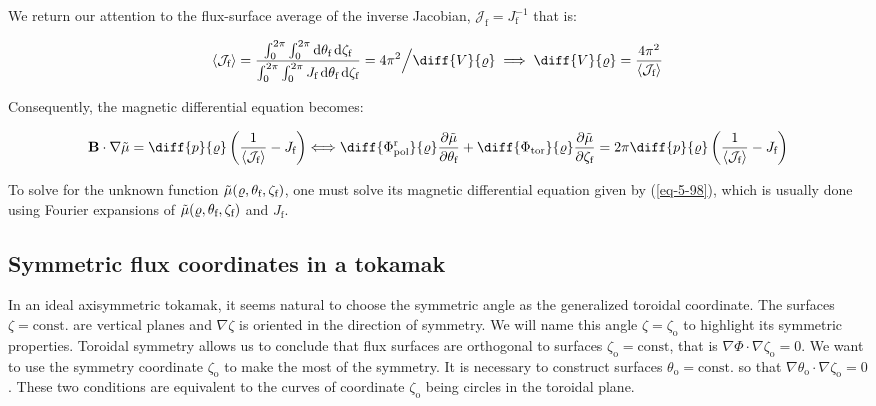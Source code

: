 We return our attention to the flux-surface average of the inverse Jacobian, $\mathcal{J}_\text{f}=J_\text{f}^{-1}$ that is:

\begin{equation}
    \label{eq-5-97}
    \langle\mathcal{J}_\text{f}\rangle=\frac{\int_0^{2\pi}\int_0^{2\pi}\mathrm{d}\theta_\text{f}\,\mathrm{d}\zeta_\text{f}}{\int_0^{2\pi}\int_0^{2\pi}J_\text{f}\,\mathrm{d}\theta_\text{f}\,\mathrm{d}\zeta_\text{f}}=4\pi^2\Big/\diff{V}{\varrho}\implies\diff{V}{\varrho}=\frac{4\pi^2}{\langle\mathcal{J}_\text{f}\rangle}
\end{equation}

Consequently, the magnetic differential equation becomes:

\begin{equation}
    \label{eq-5-98}
    \mathbf{B}\cdot\nabla\Tilde{\mu}=\diff{p}{\varrho}\left(\frac{1}{\langle\mathcal{J}_\text{f}\rangle}-J_\text{f}\right)\Longleftrightarrow\diff{\Phi_\text{pol}^\text{r}}{\varrho}\frac{\partial\Tilde{\mu}}{\partial\theta_\text{f}}+\diff{\Phi_\text{tor}}{\varrho}\frac{\partial\Tilde{\mu}}{\partial\zeta_\text{f}}=2\pi\diff{p}{\varrho}\left(\frac{1}{\langle\mathcal{J}_\text{f}\rangle}-J_\text{f}\right)
\end{equation}

To solve for the unknown function $\Tilde{\mu}(\varrho,\theta_\text{f},\zeta_\text{f})$, one must solve its magnetic differential equation given by (\ref{eq-5-98}), which is usually done using Fourier expansions of $\Tilde{\mu}(\varrho,\theta_\text{f},\zeta_\text{f})$ and $J_\text{f}$.

\subsection{Symmetric flux coordinates in a tokamak}

In an ideal axisymmetric tokamak, it seems natural to choose the symmetric angle as the generalized toroidal coordinate. The surfaces $\zeta=\text{const.}$ are vertical planes and $\nabla\zeta$ is oriented in the direction of symmetry. We will name this angle $\zeta=\zeta_\text{o}$ to highlight its symmetric properties. Toroidal symmetry allows us to conclude that flux surfaces are orthogonal to surfaces $\zeta_\text{o}=\text{const}$, that is $\nabla\Phi\cdot\nabla\zeta_\text{o}=0$. We want to use the symmetry coordinate $\zeta_\text{o}$ to make the most of the symmetry. It is necessary to construct surfaces $\theta_\text{o}=\text{const.}$ so that $\nabla\theta_\text{o}\cdot\nabla\zeta_\text{o}=0$. These two conditions are equivalent to the curves of coordinate $\zeta_\text{o}$ being circles in the toroidal plane.


